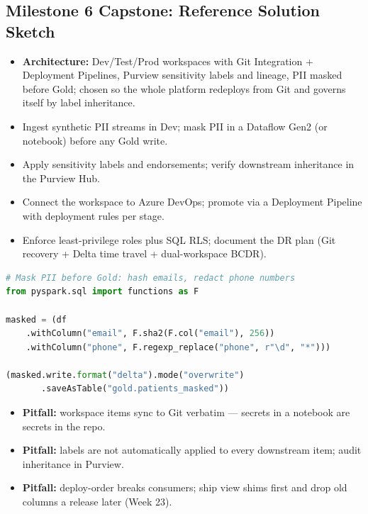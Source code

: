\documentclass[11pt, a4paper]{article}
\begin{document}
\subsection*{Milestone 6 Capstone: Reference Solution Sketch}
\begin{itemize}[label=-, itemsep=0pt]
    \item \textbf{Architecture:} Dev/Test/Prod workspaces with Git Integration + Deployment Pipelines, Purview sensitivity labels and lineage, PII masked before Gold; chosen so the whole platform redeploys from Git and governs itself by label inheritance.
    \item Ingest synthetic PII streams in Dev; mask PII in a Dataflow Gen2 (or notebook) before any Gold write.
    \item Apply sensitivity labels and endorsements; verify downstream inheritance in the Purview Hub.
    \item Connect the workspace to Azure DevOps; promote via a Deployment Pipeline with deployment rules per stage.
    \item Enforce least-privilege roles plus SQL RLS; document the DR plan (Git recovery + Delta time travel + dual-workspace BCDR).
\end{itemize}
\begin{lstlisting}[language=Python]
# Mask PII before Gold: hash emails, redact phone numbers
from pyspark.sql import functions as F

masked = (df
    .withColumn("email", F.sha2(F.col("email"), 256))
    .withColumn("phone", F.regexp_replace("phone", r"\d", "*")))

(masked.write.format("delta").mode("overwrite")
       .saveAsTable("gold.patients_masked"))
\end{lstlisting}
\begin{itemize}[label=-, itemsep=0pt]
    \item \textbf{Pitfall:} workspace items sync to Git verbatim --- secrets in a notebook are secrets in the repo.
    \item \textbf{Pitfall:} labels are not automatically applied to every downstream item; audit inheritance in Purview.
    \item \textbf{Pitfall:} deploy-order breaks consumers; ship view shims first and drop old columns a release later (Week 23).
\end{itemize}
\end{document}
